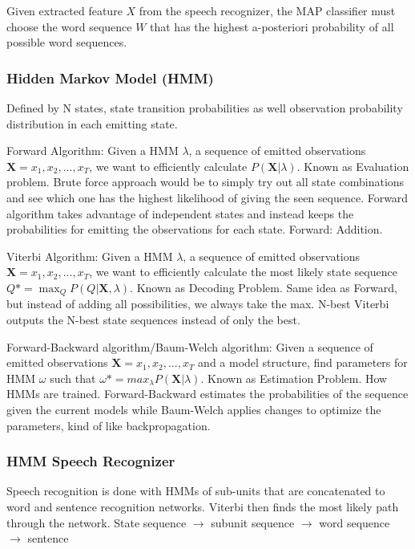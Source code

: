 \documentclass[10pt, a4paper]{article}
\begin{document}
Given extracted feature  $ X $ from the speech recognizer, the MAP classifier must choose the word sequence $ W $
that has the highest a-posteriori probability of all possible word sequences.

\subsubsection{Hidden Markov Model (HMM)}
Defined by N states, state transition probabilities as well observation probability distribution in each emitting state.

Forward Algorithm: Given a HMM $ \lambda $, a sequence of emitted observations $ \textbf{X} = x_1, x_2, ..., x_T $,
we want to efficiently calculate $ P(\textbf{X} | \lambda) $. Known as Evaluation problem.
Brute force approach would be to simply try out all state combinations and see which one has the highest likelihood of giving the seen sequence.
Forward algorithm takes advantage of independent states and instead keeps the probabilities for emitting the observations for each state. Forward: Addition.

Viterbi Algorithm: Given a HMM $ \lambda $, a sequence of emitted observations $ \textbf{X} = x_1, x_2, ..., x_T $,
we want to efficiently calculate the most likely state sequence $ Q* = \max_Q P(Q | \textbf{X}, \lambda) $.
Known as Decoding Problem. Same idea as Forward, but instead of adding all possibilities, we always take the max.
N-best Viterbi outputs the N-best state sequences instead of only the best.

Forward-Backward algorithm/Baum-Welch algorithm: Given a sequence of emitted observations $ \textbf{X} = x_1, x_2, ..., x_T $ and a model structure,
find parameters for HMM $ \omega $ such that $ \omega* = max_{\lambda} P(\textbf{X} | \lambda) $.
Known as Estimation Problem. How HMMs are trained.
Forward-Backward estimates the probabilities of the sequence given the current models while Baum-Welch applies changes to optimize the parameters,
kind of like backpropagation.

\subsubsection{HMM Speech Recognizer}
Speech recognition is done with HMMs of sub-units that are concatenated to word and sentence recognition networks.
Viterbi then finds the most likely path through the network.
State sequence $ \xrightarrow{} $ subunit sequence $ \xrightarrow{} $ word sequence $ \xrightarrow{} $ sentence
\end{document}
